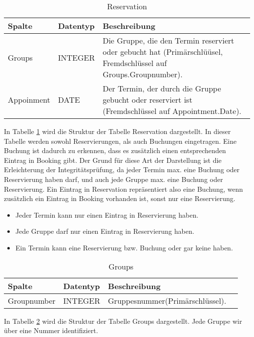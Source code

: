 \documentclass[10pt,a4paper]{article}
\begin{document}
\begin{table}[h]
\centering
	\caption{Reservation}
	\label{tab:Reservation}
    \begin{tabular}{| l | l | l |}
    \hline
    \rowcolor{lightgray} Spalte & Datentyp & Beschreibung  \\ \hline
    Groups & INTEGER & Die Gruppe, die den Termin reserviert oder gebucht hat (Primärschlüüsel, Fremdschlüssel auf Groups.Groupnumber).  \\ \hline
    Appoinment & DATE & Der Termin, der durch die Gruppe gebucht oder reserviert ist (Fremdschlüssel auf Appointment.Date). \\ \hline
    \end{tabular}
\end{table}
In Tabelle \ref{tab:Reservation} wird die Struktur der Tabelle Reservation  dargestellt.  In dieser Tabelle werden sowohl Reservierungen, als auch Buchungen eingetragen. Eine Buchung ist dadurch zu erkennen, dass es zusätzlich einen entsprechenden Eintrag in Booking gibt. Der Grund für diese Art der Darstellung ist die Erleichterung der Integritätsprüfung, da jeder Termin max. eine Buchung oder Reservierung haben darf, und auch jede Gruppe max. eine Buchung oder Reservierung. Ein Eintrag in Reservation repräsentiert also eine Buchung, wenn zusätzlich ein Eintrag in Booking vorhanden ist, sonst nur eine Reservierung.

\begin{itemize} 
	\item Jeder Termin kann nur einen Eintrag in Reservierung haben.
	\item Jede Gruppe darf nur einen Eintrag in Reservierung haben.
	\item Ein Termin kann eine Reservierung bzw. Buchung oder gar keine haben.
\end{itemize}

\begin{table}[h]
\centering
\caption{Groups}
    \label{tab:Groups}    
    \begin{tabular}{| l | l | l | l |}
    \hline
    \rowcolor{lightgray} Spalte & Datentyp & Beschreibung  \\ \hline
    Groupnumber & INTEGER & Gruppesnummer(Primärschlüssel).  \\ \hline
   \end{tabular}
\end{table}

In Tabelle \ref{tab:Groups} wird die Struktur der Tabelle Groups dargestellt. Jede Gruppe wir über eine Nummer identifiziert.
\end{document}
